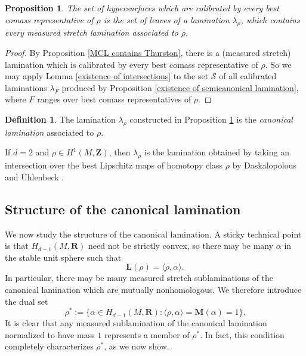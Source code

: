\documentclass[reqno,11pt]{amsart}
\newcommand{\ZZ}{\mathbf{Z}}
\newcommand{\RR}{\mathbf{R}}
\newcommand{\Mass}{\mathbf M}
\newcommand{\Comass}{\mathbf L}
\newcommand{\dfn}[1]{\emph{#1}\index{#1}}
\newtheorem{proposition}[theorem]{Proposition}
\theoremstyle{definition}
\newtheorem{definition}[theorem]{Definition}
\numberwithin{equation}{section}
\begin{document}
\begin{proposition}\label{existence of canonical lamination}
The set of hypersurfaces which are calibrated by every best comass representative of $\rho$ is the set of leaves of a lamination $\lambda_\rho$, which contains every measured stretch lamination associated to $\rho$.
\end{proposition}
\begin{proof}
By Proposition \ref{MCL contains Thurston}, there is a (measured stretch) lamination which is calibrated by every best comass representative of $\rho$.
So we may apply Lemma \ref{existence of intersections} to the set $\mathscr S$ of all calibrated laminations $\lambda_F$ produced by Proposition \ref{existence of semicanonical lamination}, where $F$ ranges over best comass representatives of $\rho$.
\end{proof}

\begin{definition}
The lamination $\lambda_\rho$ constructed in Proposition \ref{existence of canonical lamination} is the \dfn{canonical lamination} associated to $\rho$.
\end{definition}

If $d = 2$ and $\rho \in H^1(M, \ZZ)$, then $\lambda_\rho$ is the lamination obtained by taking an intersection over the best Lipschitz maps of homotopy class $\rho$ by Daskalopolous and Uhlenbeck \cite[\S6.2]{daskalopoulos2020transverse}.

\subsection{Structure of the canonical lamination}\label{canonical structure}
We now study the structure of the canonical lamination.
A sticky technical point is that $H_{d - 1}(M, \RR)$ need not be strictly convex, so there may be many $\alpha$ in the stable unit sphere such that 
\begin{equation}\label{flats duality}
\Comass(\rho) = \langle \rho, \alpha\rangle.
\end{equation}
In particular, there may be many measured stretch sublaminations of the canonical lamination which are mutually nonhomologous.
We therefore introduce the dual set 
$$\rho^* := \{\alpha \in H_{d - 1}(M, \RR): \langle \rho, \alpha\rangle = \Mass(\alpha) = 1\}.$$
It is clear that any measured sublamination of the canonical lamination normalized to have mass $1$ represents a member of $\rho^*$.
In fact, this condition completely characterizes $\rho^*$, as we now show.
\end{document}
